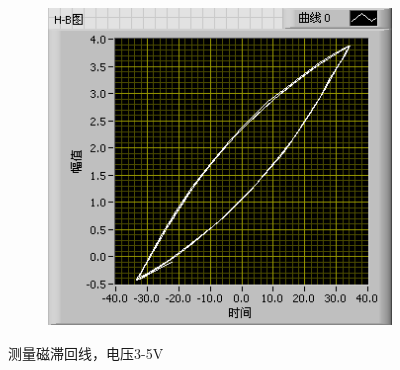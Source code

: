 \documentclass{ctexart}
\begin{document}
\begin{figure}[H]
\begin{subfigure}{0.32\linewidth}
  \end{subfigure}
  \begin{subfigure}{0.32\linewidth}
    \includegraphics[width=\linewidth]{LabVIEW使用基础/铁材料的磁滞现象和磁滞回线/5V.png}
  \end{subfigure}
  \caption{测量磁滞回线，电压3-5V}
\end{figure}
\end{document}
